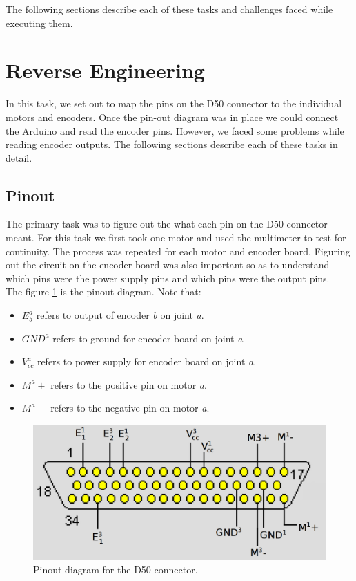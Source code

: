 \documentclass[10pt,a4paper]{article}
\begin{document}
The following sections describe each of these tasks and challenges
faced while executing them.

\section{Reverse Engineering}

In this task, we set out to map the pins on the D50 connector to the
individual motors and encoders. Once the pin-out diagram was in place
we could connect the Arduino and read the encoder pins. However, we
faced some problems while reading encoder outputs. The following
sections describe each of these tasks in detail. \\

\subsection{Pinout}
The primary task was to figure out the what each pin on the D50
connector meant. For this task we first took one motor and used the
multimeter to test for continuity. The process was repeated for each
motor and encoder board. Figuring out the circuit on the encoder board
was also important so as to understand which pins were the power
supply pins and which pins were the output pins.\\

The figure \ref{fig:dsub} is the pinout diagram. Note
that: \begin{itemize} 
\item \( E^a_b \) refers to output of encoder \textit{b} on joint \textit{a}.
\item \( GND^a \) refers to ground for encoder board on joint \textit{a}.
\item \( V^a_{cc} \) refers to power supply for encoder board on joint
\textit{a}.
\item \( M^a+ \) refers to the positive pin on motor \textit{a}.
\item \( M^a- \) refers to the negative pin on motor \textit{a}.
\end{itemize}


\begin{figure}[h]
    \centering
    \includegraphics[scale=0.3]{dsub50.png}
    \caption{Pinout diagram for the D50 connector.}
    \label{fig:dsub}
\end{figure}
\end{document}
